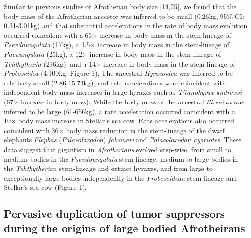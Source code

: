 \documentclass[10pt,letterpaper]{article}
\begin{document}
Similar to previous studies of Afrotherian body size {[}19,25{]}, we
found that the body mass of the Afrotherian ancestor was inferred to be
small (0.26kg, 95\% CI: 0.31-3.01kg) and that substantial accelerations
in the rate of body mass evolution occurred coincident with a 65×
increase in body mass in the stem-lineage of \emph{Pseudoungulata}
(17kg), a 1.5× increase in body mass in the stem-lineage of
\emph{Paenungulata} (25kg), a 12× increase in body mass in the
stem-lineage of \emph{Tehthytheria} (296kg), and a 14× increase in body
mass in the stem-lineage of \emph{Proboscidea} (4,100kg; Figure 1). The
ancestral \emph{Hyracoidea} was inferred to be relatively small
(2.86-15.71kg), and rate accelerations were coincident with independent
body mass increases in large hyraxes such as \emph{Titanohyrax andrewsi}
(67× increase in body mass). While the body mass of the ancestral
\emph{Sirenian} was inferred to be large (61-656kg), a rate acceleration
occurred coincident with a 10× body mass increase in Stellar's sea cow.
Rate accelerations also occurred coincident with 36× body mass reduction
in the stem-lineage of the dwarf elephants \emph{Elephas}
(\emph{Palaeoloxodon}) \emph{falconeri} and \emph{Palaeoloxodon
cypriotes}. These data suggest that gigantism in \emph{Afrotherians}
evolved step-wise, from small to medium bodies in the
\emph{Pseudoungulata} stem-lineage, medium to large bodies in the
\emph{Tehthytherian} stem-lineage and extinct hyraxes, and from large to
exceptionally large bodies independently in the \emph{Proboscidean}
stem-lineage and Stellar's sea cow (Figure 1).

\hypertarget{pervasive-duplication-of-tumor-suppressors-during-the-origins-of-large-bodied-afrotheirans}{%
\subsection{Pervasive duplication of tumor suppressors during the
origins of large bodied
Afrotheirans}\label{pervasive-duplication-of-tumor-suppressors-during-the-origins-of-large-bodied-afrotheirans}}
\end{document}
